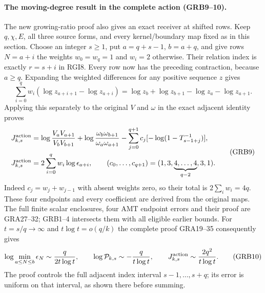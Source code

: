 \label{GRBUILD:GRB_SHIFTED_ACTION:start}
\paragraph{The moving-degree result in the complete action (GRB9--10).}
The new growing-ratio proof also gives an exact receiver at shifted rows.
Keep $q,\chi,E$, all three source forms, and every kernel/boundary map
fixed as in this section.  Choose an integer $s\ge1$, put $a=q+s-1$,
$b=a+q$, and give rows $N=a+i$ the weights $w_0=w_q=1$ and $w_i=2$
otherwise.  Their relation index is exactly $r=s+i$ in RGI8.  Every row
now has the preceding contraction, because $a\ge q$.  Expanding the
weighted differences for any positive sequence $z$ gives
\[
 \sum_{i=0}^q w_i(\log z_{a+i+1}-\log z_{a+i})
 =\log z_b+\log z_{b+1}-\log z_a-\log z_{a+1}.
\]
Applying this separately to the original $V$ and $\omega$ in the exact
adjacent identity proves
\begin{equation}
\begin{split}
 J_{k,s}^{\rm action}
 &=\log\frac{V_aV_{a+1}}{V_bV_{b+1}}
  +\log\frac{\omega_b\omega_{b+1}}{\omega_a\omega_{a+1}}
  -\sum_{j=0}^{q+1}c_j[-\log(1-T_{s-1+j}^{-1})],\\
 J_{k,s}^{\rm action}&=2\sum_{i=0}^qw_i\log\epsilon_{a+i},\qquad
 (c_0,\ldots,c_{q+1})=(1,3,\underbrace{4,\ldots,4}_{q-2},3,1).
\end{split}\tag{GRB9}\label{GRB:shifted-action}
\end{equation}
Indeed $c_j=w_j+w_{j-1}$ with absent weights zero, so their total is
$2\sum_iw_i=4q$.  These four endpoints and every coefficient are derived
from the original maps.  The full finite scalar enclosures, four AMT
endpoint errors and their proof are GRA27--32; GRB1--4 intersects them
with all eligible earlier bounds.  For $t=s/q\to\infty$ and
$t\log t=o(q/k)$ the complete proof GRA19--35 consequently gives
\begin{equation}
 \log\min_{a\le N\le b}\epsilon_N\sim\frac{q}{2t\log t},\qquad
 \log\mathcal P_{k,s}\sim-\frac{q}{t\log t},\qquad
 J_{k,s}^{\rm action}\sim\frac{2q^2}{t\log t}.
\tag{GRB10}\label{GRB:shifted-rates}
\end{equation}
The proof controls the full adjacent index interval $s-1,\ldots,s+q$;
its error is uniform on that interval, as shown there before summing.

